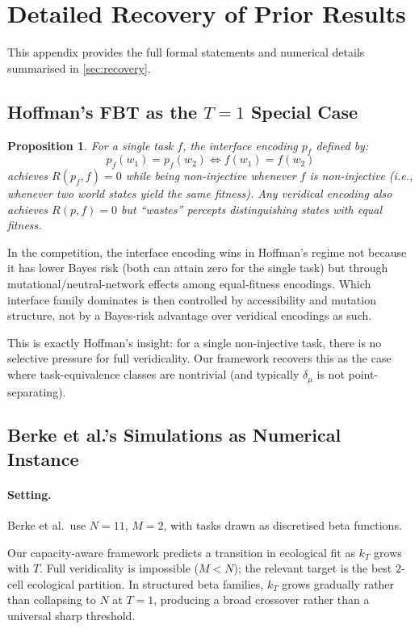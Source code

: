 \documentclass[12pt]{article}
\newtheorem{proposition}[theorem]{Proposition}
\newcommand{\dmu}{\delta_\mu}
\begin{document}
\section{Detailed Recovery of Prior Results}\label{app:recovery}

This appendix provides the full formal statements and numerical details summarised in \cref{sec:recovery}.

\subsection{Hoffman's FBT as the \texorpdfstring{$T=1$}{T=1} Special Case}\label{app:hoffman}

\begin{proposition}\label{prop:hoffman}
For a single task $f$, the interface encoding $p_f$ defined by:
\[
p_f(w_1) = p_f(w_2) \iff f(w_1) = f(w_2)
\]
achieves $R(p_f, f) = 0$ while being non-injective whenever $f$ is non-injective (i.e., whenever two world states yield the same fitness). Any veridical encoding also achieves $R(p, f) = 0$ but ``wastes'' percepts distinguishing states with equal fitness.
\end{proposition}

In the competition, the interface encoding wins in Hoffman's regime not because it has lower Bayes risk (both can attain zero for the single task) but through mutational/neutral-network effects among equal-fitness encodings. Which interface family dominates is then controlled by accessibility and mutation structure, not by a Bayes-risk advantage over veridical encodings as such.

This is exactly Hoffman's insight: for a single non-injective task, there is no selective pressure for full veridicality. Our framework recovers this as the case where task-equivalence classes are nontrivial (and typically $\dmu$ is not point-separating).

\subsection{Berke et al.'s Simulations as Numerical Instance}\label{app:berke}

\paragraph{Setting.}\label{prop:berke}
Berke et al.\ use $N = 11$, $M = 2$, with tasks drawn as discretised beta functions.

Our capacity-aware framework predicts a transition in ecological fit as $k_T$ grows with $T$. Full veridicality is impossible ($M < N$); the relevant target is the best $2$-cell ecological partition. In structured beta families, $k_T$ grows gradually rather than collapsing to $N$ at $T = 1$, producing a broad crossover rather than a universal sharp threshold.
\end{document}
